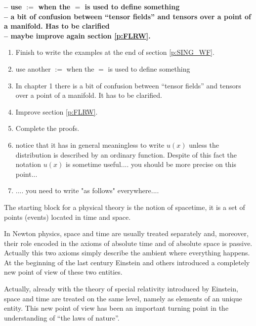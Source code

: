 \documentclass[11pt]{book}
\newcommand{\com}[1]{{\color{red}\bf #1}}
\theoremstyle{break}
\begin{document}
\com{
-- use $:=$ when the $=$ is used to define something \\[4pt]
-- a bit of confusion between ``tensor fields'' and tensors over a point of a manifold. Has to be clarified \\[4pt]
-- maybe improve again section \ref{p:FLRW}.

\bigskip



\begin{enumerate}


\item Finish to write the examples at the end of section \ref{p:SING_WF}.


\item use another $:=$ when the $=$ is used to define something


\item In chapter 1 there is a bit of confusion between ``tensor fields'' and tensors over a point of a manifold. It has to be clarified.


\item Improve section \ref{p:FLRW}.


\item Complete the proofs.


\item notice that it has in general meaningless to write $u(x)$ unless the distribution is described by an ordinary function. Despite of this fact the notation $u(x)$ is sometime useful.... you should be more precise on this point...


\item .... you need to write "as follows" everywhere.... 

\end{enumerate}


\noindent
}


\bigskip

The starting block for a physical theory is the notion of spacetime, it is a set of points (events) located in time and space. 


In Newton physics, space and time are usually treated separately and, moreover, their role encoded in the axioms of absolute time and of absolute space is passive. Actually this two axioms simply describe the ambient where everything happens. At the beginning of the last century Einstein and others introduced a completely new point of view of these two entities.


Actually, already with the theory of special relativity introduced by Einstein, space and time are treated on the same level, namely as elements of an unique entity. This new point of view has been an important turning point in the understanding of ``the laws of nature''.
\end{document}
